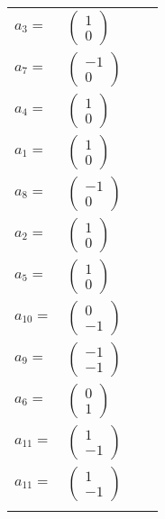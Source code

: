 \documentclass[1p]{elsarticle_modified}
\theoremstyle{definition}
\begin{document}
\begin{tabular}{m{7pt} m{180pt} m{7pt} m{180pt} }
\flushright $a_{3}=$&$\begin{pmatrix}1\\0\end{pmatrix}$ \\
\flushright $a_{7}=$&$\begin{pmatrix}-1\\0\end{pmatrix}$ \\
\flushright $a_{4}=$&$\begin{pmatrix}1\\0\end{pmatrix}$ \\
\flushright $a_{1}=$&$\begin{pmatrix}1\\0\end{pmatrix}$ \\
\flushright $a_{8}=$&$\begin{pmatrix}-1\\0\end{pmatrix}$ \\
\flushright $a_{2}=$&$\begin{pmatrix}1\\0\end{pmatrix}$ \\
\flushright $a_{5}=$&$\begin{pmatrix}1\\0\end{pmatrix}$ \\
\flushright $a_{10}=$&$\begin{pmatrix}0\\-1\end{pmatrix}$ \\
\flushright $a_{9}=$&$\begin{pmatrix}-1\\-1\end{pmatrix}$ \\
\flushright $a_{6}=$&$\begin{pmatrix}0\\1\end{pmatrix}$ \\
\flushright $a_{11}=$&$\begin{pmatrix}1\\-1\end{pmatrix}$\\ \flushright $a_{11}=$&$\begin{pmatrix}1\\-1\end{pmatrix}$\\&\end{tabular}
\end{document}
